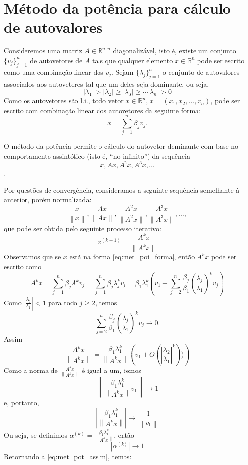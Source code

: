 \section{Método da potência para cálculo de autovalores}
Consideremos uma matriz $A\in \mathbb{R}^{n,n}$ diagonalizável, isto é, existe um conjunto $\{v_{j}\}_{j=1}^n$ de autovetores de $A$ tais que qualquer elemento $x\in\mathbb{R}^n$ pode ser escrito como uma combinação linear dos $v_{j}$. Sejam $\{\lambda_j\}_{j=1}^n$ o conjunto de autovalores associados aos autovetores tal que um deles seja dominante, ou seja,
$$
|\lambda_1|>|\lambda_2|\geq |\lambda_3|\geq\cdots |\lambda_n|>0
$$
Como os autovetores são l.i., todo vetor $x\in\mathbb{R}^n$, $x=(x_1,x_2,...,x_n)$, pode ser escrito com combinação linear dos autovetores da seguinte forma:
\begin{equation}\label{eq:met_pot_forma}
x=\sum_{j=1}^n\beta_jv_{j}.
\end{equation}

O método da potência permite o cálculo do autovetor dominante com base no comportamento assintótico (isto é, ``no infinito'') da sequência
$$x, Ax, A^2x, A^3x, \ldots$$.

Por questões de convergência, consideramos a seguinte sequência semelhante à anterior, porém normalizada:
$$\frac{x}{\left\|x\right\|}, \frac{Ax}{\|Ax\|}, \frac{A^2x}{\|A^2x\|}, \frac{A^3x}{\|A^3x\|}, \ldots,$$
que pode ser obtida pelo seguinte processo iterativo:
$$x^{(k+1)}=\frac{A^{k}x}{\|A^{k}x\|}$$
Observamos que se $x$ está na forma \eqref{eq:met_pot_forma}, então $A^k x$ pode ser escrito como
$$A^{k} x = \sum_{j=1}^n\beta_j A^k v_{j}=\sum_{j=1}^n\beta_j \lambda_j^k v_{j}= \beta_1\lambda_1^k\left(v_1+\sum_{j=2}^n\frac{\beta_j}{\beta_1} \left(\frac{\lambda_j}{\lambda_1}\right)^k v_{j}\right)$$
Como $\left|\frac{\lambda_j}{\lambda_1}\right|<1$ para todo $j\geq 2$, temos
$$\sum_{j=2}^n\frac{\beta_j}{\beta_1} \left(\frac{\lambda_j}{\lambda_1}\right)^k v_{j} \to 0.$$
Assim
\begin{equation}\label{eq:met_pot_assim}
  \frac{A^k x}{\left\|A^k x\right\|} = \frac{\beta_1\lambda_1^k}{\left\|A^k x\right\|}\left( v_1 + O\left(\left|\frac{\lambda_2}{\lambda_1}\right|^k\right))\right) 
\end{equation}
Como a norma de $\frac{A^k x}{\left\|A^k x\right\|}$ é igual a um, temos
$$\left\|\frac{\beta_1\lambda_1^k}{\left\|A^k x\right\|}v_1\right\| \to 1$$
e, portanto,
$$\left|\frac{\beta_1\lambda_1^k}{\left\|A^k x\right\|}\right| \to \frac{1}{\left\|v_1\right\|}$$
Ou seja, se definimos $\alpha^{(k)}=\frac{\beta_1\lambda_1^k}{\left\|A^k x\right\|}$, então
$$
|\alpha^{(k)}|\to 1
$$
Retornando a \eqref{eq:met_pot_assim}, temos:

